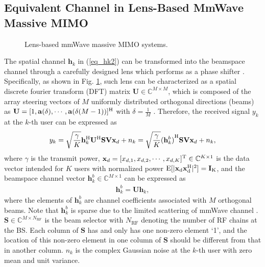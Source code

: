 \documentclass[10pt,twocolumn,twoside]{IEEEtran}
\begin{document}
\subsection{Equivalent Channel in Lens-Based MmWave Massive MIMO}\label{S2.2}
\begin{figure}[t]
\vspace{-3mm}
\vspace{-3mm}
\caption{Lens-based mmWave massive MIMO systems.}
\label{beamspaceMIMO}
\vspace{-1mm}
\end{figure}
The spatial channel $\mathbf{h}_k$ in (\ref{eq_hk2}) can be transformed into the beamspace channel through a carefully designed lens which performs as a phase shifter \cite{TAP_JBrady_Beamspace}. 
Specifically, as shown in Fig. \ref{beamspaceMIMO}, such lens can be characterized as a spatial discrete fourier transform (DFT) matrix $\mathbf{U}\in\mathbb{C}^{M\times M}$, which is composed of the array steering vectors of $M$ uniformly distributed orthogonal directions (beams) as $\mathbf{U}=[1,\mathbf{a}(\delta),\cdots,\mathbf{a}(\delta (M-1))]^{\rm{H}}$  with $\delta=\frac{1}{M}$ \cite{JTSP_HRobert_OverviewMmwave,TAP_JBrady_Beamspace}.
Therefore, the received signal $y_k$ at the $k$-th user can be expressed as
\begin{align}\label{eq_yk1}
y_k = \sqrt{\frac{\gamma}{K}}\mathbf{h}_k^{\rm{H}}\mathbf{U}^{\rm{H}}\mathbf{S}\mathbf{V}\mathbf{x}_d + n_k=\sqrt{\frac{\gamma}{K}}{(\mathbf{h}^b_k)}^{\rm{H}}\mathbf{S}\mathbf{V}\mathbf{x}_d + n_k,
\end{align}
where $\gamma$ is the transmit power, $\mathbf{x}_d=[x_{d,1},x_{d,2},\cdots,x_{d,K}]^{\rm{T}}\in\mathbb{C}^{K\times 1}$ is the data vector intended for $K$ users with normalized power $\rm{E}[|\mathbf{x}_d\mathbf{x}_d^{\rm{H}}|^2]=\mathbf{I}_K$, and the beamspace channel vector $\mathbf{h}_k^b\in\mathbb{C}^{M\times 1}$ can be expressed as
\begin{align}\label{eq_hkb}
\mathbf{h}_k^b=\mathbf{U}\mathbf{h}_k,
\end{align}
where the elements of $\mathbf{h}_k^b$ are channel coefficients associated with $M$ orthogonal beams. Note that $\mathbf{h}_k^b$ is sparse due to the limited scattering of mmWave channel \cite{TAP_JBrady_Beamspace}.
$\mathbf{S}\in\mathbb{C}^{M\times N_\text{RF}}$ is the beam selector with $N_\text{RF}$ denoting the number of RF chains at the BS. 
Each column of $\mathbf{S}$ has and only has one non-zero element `1', and the location of this non-zero element in one column of $\mathbf{S}$ should be different from that in another column. $n_k$ is the complex Gaussian noise at the $k$-th user with zero mean and unit variance.
\end{document}
